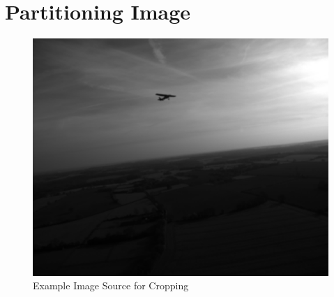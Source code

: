 \begin{table}
  \centering
  \label{tbl:anchorfree_perf}
  \vspace{-1ex}
  
\end{table}


\section{Partitioning Image}
{
\begin{figure}[p]
  \centering
  \includegraphics[height=0.25\textheight]{figures/crop_strat_source.png}
  \caption{Example Image Source for Cropping}
  \label{fig:crop-source}
\end{figure}
\begin{figure}[p]
  \centering
  \begin{subfigure}[][][t]{0.31\textwidth}

\end{subfigure}
\end{figure}}
